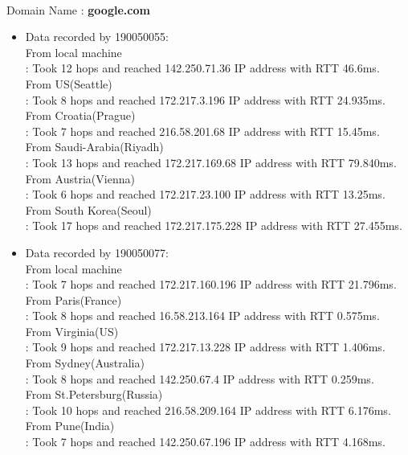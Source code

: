 \documentclass[12pt]{article}
\theoremstyle{remark}
\newcommand{\tbf}[1]{\textbf{#1}}
\begin{document}
\vspace{0.2in}
{
\centering{\Large(ii)\tbf{{Traceroute}}}\\
\vspace{8pt}}
\normalsize
\vspace{-8pt}
Domain Name : \tbf{google.com} 
\begin{itemize}
    \item Data recorded by 190050055:\\
From local machine \\
: Took 12 hops and reached 142.250.71.36 IP address with RTT 46.6ms.\\
From US(Seattle)\\
: Took 8 hops and reached 172.217.3.196 IP address with RTT 24.935ms. \\
From Croatia(Prague)\\
: Took 7 hops and reached 216.58.201.68 IP address with RTT 15.45ms. \\
From Saudi-Arabia(Riyadh) \\
: Took 13 hops and reached 172.217.169.68 IP address with RTT 79.840ms. \\
From Austria(Vienna)    \\
: Took 6 hops and reached 172.217.23.100 IP address with RTT 13.25ms. \\
From South Korea(Seoul)  \\
: Took 17 hops and reached 172.217.175.228 IP address with RTT 27.455ms.\\   \item Data recorded by 190050077:\\
From local machine      \\
: Took 7 hops and reached 172.217.160.196  IP address with RTT 21.796ms.\\
From Paris(France)       \\
: Took 8 hops and reached 16.58.213.164 IP address with RTT 0.575ms.\\
From Virginia(US)       \\
: Took 9 hops and reached 172.217.13.228 IP address with RTT 1.406ms.\\
From Sydney(Australia)   \\
: Took 8 hops and reached 142.250.67.4 IP address with RTT 0.259ms.\\
From St.Petersburg(Russia) \\
: Took 10 hops and reached 216.58.209.164 IP address with RTT 6.176ms.\\
From Pune(India)          \\
: Took 7 hops and reached 142.250.67.196 IP address with RTT 4.168ms.\\


\end{itemize}
\end{document}
